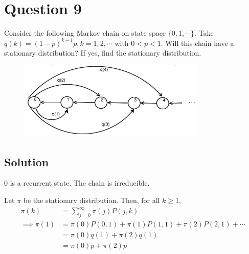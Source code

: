 \section*{Question 9}

Consider the following Markov chain on state space \( \{ 0,1, \cdots \} \).
Take \( q(k)={(1-p)}^{k-1} p, k=1,2, \cdots \) with \( 0<p<1 \).
Will this chain have a stationary distribution?
If yes, find the stationary distribution.

\begin{figure}[h]
    \centering
    \includegraphics[width=0.8\textwidth]{figures/images/q9.jpg}
\end{figure}

\subsection*{Solution}

0 is a recurrent state.
The chain is irreducible.

Let \( \pi \) be the stationary distribution.
Then, for all \( k \geq 1 \),
\begin{align*}
    \pi(k)
     & =
    \sum_{j=0}^{\infty} \pi(j) P(j,k)
    \\
    \implies
    \pi(1)
     & =
    \pi(0) P(0,1) + \pi(1) P(1,1) + \pi(2) P(2,1) + \cdots
    \\ & =
    \pi(0) q(1) + \pi(2) q(1)
    \\ & =
    \pi(0) p + \pi(2) p
\end{align*}
